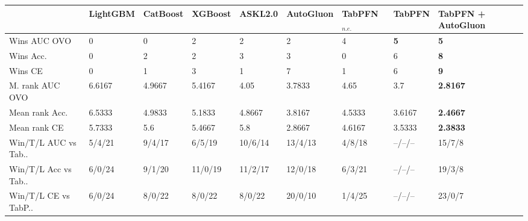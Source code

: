 \begin{tabular}{@{\hskip 0mm}
l@{\hskip 1mm}
l@{\hskip 1mm}
l@{\hskip 1mm}
l@{\hskip 1mm}
l@{\hskip 1mm}
l@{\hskip 1mm}
l@{\hskip 1mm}
l@{\hskip 1mm}
l@{\hskip 0mm}}
\toprule
{} &        LightGBM &        CatBoost &         XGBoost &         ASKL2.0 &               AutoGluon &  TabPFN$_{n.e.}$ &          TabPFN &        TabPFN + AutoGluon \\
\midrule
\midrule
Wins AUC OVO
                                         &               0 &               0 &               2 &               2 &                       2 &                4 &      \textbf{5} &                \textbf{5} \\
Wins Acc.            &               0 &               2 &               2 &               3 &                       3 &                0 &               6 &                \textbf{8} \\
Wins CE              &               0 &               1 &               3 &               1 &                       7 &                1 &               6 &                \textbf{9} \\
\midrule
M. rank AUC OVO
                                      &          6.6167 &          4.9667 &          5.4167 &            4.05 &                  3.7833 &             4.65 &             3.7 &           \textbf{2.8167} \\
Mean rank Acc.       &          6.5333 &          4.9833 &          5.1833 &          4.8667 &                  3.8167 &           4.5333 &          3.6167 &           \textbf{2.4667} \\
Mean rank CE         &          5.7333 &             5.6 &          5.4667 &             5.8 &                  2.8667 &           4.6167 &          3.5333 &           \textbf{2.3833} \\
\midrule
Win/T/L AUC
                             vs Tab.. &          5/4/21 &          9/4/17 &          6/5/19 &         10/6/14 &                 13/4/13 &           4/8/18 &           --/--/-- &                    15/7/8 \\
Win/T/L Acc vs Tab.. &          6/0/24 &          9/1/20 &         11/0/19 &         11/2/17 &                 12/0/18 &           6/3/21 &           --/--/-- &                    19/3/8 \\
Win/T/L CE vs TabP.. &          6/0/24 &          8/0/22 &          8/0/22 &          8/0/22 &                 20/0/10 &           1/4/25 &           --/--/-- &                    23/0/7 \\

\end{tabular}
